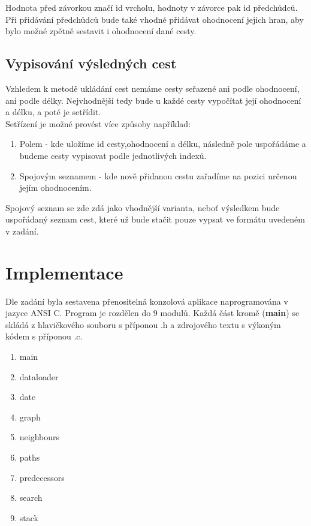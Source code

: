 \documentclass[
12pt,
a4paper,
pdftex,
czech,
titlepage
]{report}
\begin{document}
  Hodnota před závorkou značí id vrcholu, hodnoty v závorce pak id předchůdců.
  Při přidávání předchůdců bude také vhodné přidávat ohodnocení jejich hran, aby bylo možné zpětně sestavit i ohodnocení dané cesty.
  
  \section{Vypisování výsledných cest}
  Vzhledem k metodě ukládání cest nemáme cesty seřazené ani podle ohodnocení, ani podle délky. Nejvhodnější tedy bude u každé cesty vypočítat její ohodnocení a délku, a poté je setřídit.\\
  
  Setřízení je možné provést více způsoby například:
  
  \begin{enumerate}
  	\item Polem - kde uložíme id cesty,ohodnocení a délku, následně pole uspořádáme a budeme cesty vypisovat podle jednotlivých indexů.
  	\item Spojovým seznamem - kde nově přidanou cestu zařadíme na pozici určenou jejím ohodnocením.
  \end{enumerate}

	Spojový seznam se zde zdá jako vhodnější varianta, neboť výsledkem bude uspořádaný seznam cest, které už bude stačit pouze vypsat ve formátu uvedeném v zadání.

\chapter{Implementace}
Dle zadání byla sestavena přenositelná konzolová aplikace naprogramována v jazyce ANSI C. Program je rozdělen do 9 modulů. Každá část kromě (\textbf{main}) se skládá z hlavičkového souboru s příponou .h a zdrojového textu s výkoným kódem s příponou .c.

\begin{enumerate}
	\item main
	\item dataloader
	\item date
	\item graph
	\item neighbours
	\item paths
	\item predecessors
	\item search
	\item stack
\end{enumerate}
\end{document}

